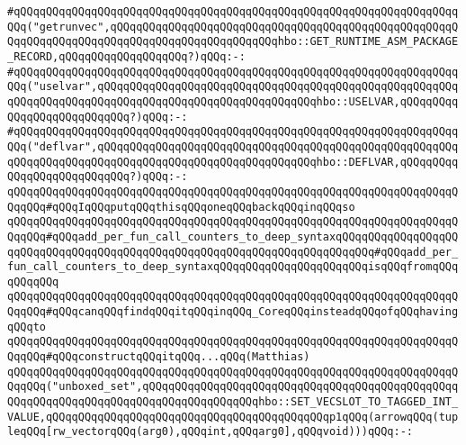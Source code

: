 \verb|#qQQqqQQqqQQqqQQqqQQqqQQqqQQqqQQqqQQqqQQqqQQqqQQqqQQqqQQqqQQqqQQqqQQqqQQq("getrunvec",qQQqqQQqqQQqqQQqqQQqqQQqqQQqqQQqqQQqqQQqqQQqqQQqqQQqqQQqqQQqqQQqqQQqqQQqqQQqqQQqqQQqqQQqqQQqqQQqhbo::GET_RUNTIME_ASM_PACKAGE_RECORD,qQQqqQQqqQQqqQQqqQQq?)qQQq:-:|\newline
\verb|#qQQqqQQqqQQqqQQqqQQqqQQqqQQqqQQqqQQqqQQqqQQqqQQqqQQqqQQqqQQqqQQqqQQqqQQq("uselvar",qQQqqQQqqQQqqQQqqQQqqQQqqQQqqQQqqQQqqQQqqQQqqQQqqQQqqQQqqQQqqQQqqQQqqQQqqQQqqQQqqQQqqQQqqQQqqQQqqQQqqQQqhbo::USELVAR,qQQqqQQqqQQqqQQqqQQqqQQqqQQq?)qQQq:-:|\newline
\verb|#qQQqqQQqqQQqqQQqqQQqqQQqqQQqqQQqqQQqqQQqqQQqqQQqqQQqqQQqqQQqqQQqqQQqqQQq("deflvar",qQQqqQQqqQQqqQQqqQQqqQQqqQQqqQQqqQQqqQQqqQQqqQQqqQQqqQQqqQQqqQQqqQQqqQQqqQQqqQQqqQQqqQQqqQQqqQQqqQQqqQQqhbo::DEFLVAR,qQQqqQQqqQQqqQQqqQQqqQQqqQQq?)qQQq:-:|\newline
\newline
\newline
\newline
\newline
\verb|qQQqqQQqqQQqqQQqqQQqqQQqqQQqqQQqqQQqqQQqqQQqqQQqqQQqqQQqqQQqqQQqqQQqqQQqqQQq#qQQqIqQQqputqQQqthisqQQqoneqQQqbackqQQqinqQQqso|\newline
\verb|qQQqqQQqqQQqqQQqqQQqqQQqqQQqqQQqqQQqqQQqqQQqqQQqqQQqqQQqqQQqqQQqqQQqqQQqqQQq#qQQqadd_per_fun_call_counters_to_deep_syntaxqQQqqQQqqQQqqQQqqQQqqQQqqQQqqQQqqQQqqQQqqQQqqQQqqQQqqQQqqQQqqQQqqQQqqQQqqQQq#qQQqadd_per_fun_call_counters_to_deep_syntaxqQQqqQQqqQQqqQQqqQQqqQQqisqQQqfromqQQqqQQqqQQq|\newline
\verb|qQQqqQQqqQQqqQQqqQQqqQQqqQQqqQQqqQQqqQQqqQQqqQQqqQQqqQQqqQQqqQQqqQQqqQQqqQQq#qQQqcanqQQqfindqQQqitqQQqinqQQq_CoreqQQqinsteadqQQqofqQQqhavingqQQqto|\newline
\verb|qQQqqQQqqQQqqQQqqQQqqQQqqQQqqQQqqQQqqQQqqQQqqQQqqQQqqQQqqQQqqQQqqQQqqQQqqQQq#qQQqconstructqQQqitqQQq...qQQq(Matthias)|\newline
\newline
\newline
\verb|qQQqqQQqqQQqqQQqqQQqqQQqqQQqqQQqqQQqqQQqqQQqqQQqqQQqqQQqqQQqqQQqqQQqqQQqqQQq("unboxed_set",qQQqqQQqqQQqqQQqqQQqqQQqqQQqqQQqqQQqqQQqqQQqqQQqqQQqqQQqqQQqqQQqqQQqqQQqqQQqqQQqqQQqqQQqhbo::SET_VECSLOT_TO_TAGGED_INT_VALUE,qQQqqQQqqQQqqQQqqQQqqQQqqQQqqQQqqQQqqQQqqQQqp1qQQq(arrowqQQq(tupleqQQq[rw_vectorqQQq(arg0),qQQqint,qQQqarg0],qQQqvoid)))qQQq:-:|\newline
